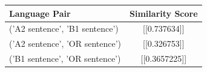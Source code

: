 \begin{tabular}{|l|c|}
\hline
Language Pair & Similarity Score \\
\hline
('A2 sentence', 'B1 sentence') & [[0.737634]] \\
('A2 sentence', 'OR sentence') & [[0.326753]] \\
('B1 sentence', 'OR sentence') & [[0.3657225]] \\
\hline
\end{tabular}

